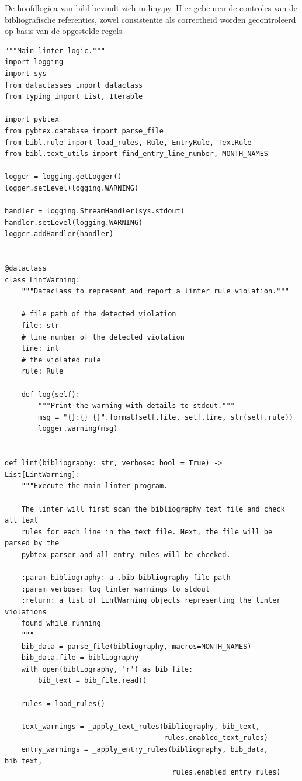 De hoofdlogica van bibl bevindt zich in liny.py. 
Hier gebeuren de controles van de bibliografische referenties, zowel consistentie als correctheid worden gecontroleerd op basis van de opgestelde regels.

\begin{verbatim}
"""Main linter logic."""
import logging
import sys
from dataclasses import dataclass
from typing import List, Iterable

import pybtex
from pybtex.database import parse_file
from bibl.rule import load_rules, Rule, EntryRule, TextRule
from bibl.text_utils import find_entry_line_number, MONTH_NAMES

logger = logging.getLogger()
logger.setLevel(logging.WARNING)

handler = logging.StreamHandler(sys.stdout)
handler.setLevel(logging.WARNING)
logger.addHandler(handler)


@dataclass
class LintWarning:
    """Dataclass to represent and report a linter rule violation."""

    # file path of the detected violation
    file: str
    # line number of the detected violation
    line: int
    # the violated rule
    rule: Rule

    def log(self):
        """Print the warning with details to stdout."""
        msg = "{}:{} {}".format(self.file, self.line, str(self.rule))
        logger.warning(msg)


def lint(bibliography: str, verbose: bool = True) -> List[LintWarning]:
    """Execute the main linter program.

    The linter will first scan the bibliography text file and check all text
    rules for each line in the text file. Next, the file will be parsed by the
    pybtex parser and all entry rules will be checked.

    :param bibliography: a .bib bibliography file path
    :param verbose: log linter warnings to stdout
    :return: a list of LintWarning objects representing the linter violations
    found while running
    """
    bib_data = parse_file(bibliography, macros=MONTH_NAMES)
    bib_data.file = bibliography
    with open(bibliography, 'r') as bib_file:
        bib_text = bib_file.read()

    rules = load_rules()

    text_warnings = _apply_text_rules(bibliography, bib_text,
                                      rules.enabled_text_rules)
    entry_warnings = _apply_entry_rules(bibliography, bib_data, bib_text,
                                        rules.enabled_entry_rules)


\end{verbatim}
